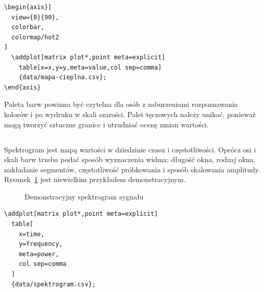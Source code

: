 \begin{lstlisting}[caption={\ploren{Mapa cieplna z wartościami jawnymi}{Heat map with explicit values}}]
\begin{axis}[
  view={0}{90},
  colorbar,
  colormap/hot2
]
  \addplot[matrix plot*,point meta=explicit]
    table[x=x,y=y,meta=value,col sep=comma]
    {data/mapa-cieplna.csv};
\end{axis}
\end{lstlisting}

Paleta barw powinna być czytelna dla osób z zaburzeniami rozpoznawania kolorów i po wydruku w skali szarości. Palet tęczowych należy unikać, ponieważ mogą tworzyć sztuczne granice i utrudniać ocenę zmian wartości.

\subsection{}

Spektrogram jest mapą wartości w dziedzinie czasu i częstotliwości. Oprócz osi i skali barw trzeba podać sposób wyznaczenia widma: długość okna, rodzaj okna, nakładanie segmentów, częstotliwość próbkowania i sposób skalowania amplitudy. Rysunek~\ref{fig:spektrogram} jest niewielkim przykładem demonstracyjnym.

\begin{figure}[htbp]
  \centering
  \caption{Demonstracyjny spektrogram sygnału}
  \label{fig:spektrogram}
\end{figure}

\begin{lstlisting}[caption={\ploren{Spektrogram zapisany jako tabela wartości}{Spectrogram stored as a table of values}}]
\addplot[matrix plot*,point meta=explicit]
  table[
    x=time,
    y=frequency,
    meta=power,
    col sep=comma
  ]
  {data/spektrogram.csv};
\end{lstlisting}

